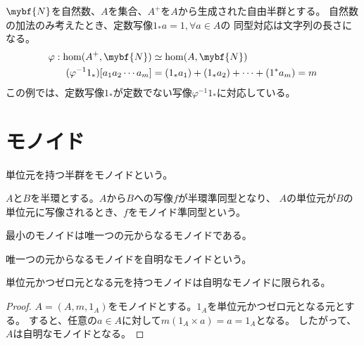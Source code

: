 	\begin{example}[文字列の長さ]\label{obs:文字列の長さ} %
		$\mybf{N}$を自然数、$A$を集合、$A^+$を$A$から生成された自由半群とする。
		自然数の加法のみ考えたとき、定数写像$1_*a=1,\forall a\in A$の
		同型対応は文字列の長さになる。
		\begin{equation*}\begin{split} %
			\varphi: \hom(A^+,\mybf{N}) &\simeq \hom(A,\mybf{N}) \\
			(\varphi^{-1}1_*)[a_1a_2\cdots a_m] &= (1_*a_1)+(1_*a_2)+\cdots+(1^*a_m) = m \\
		\end{split}\end{equation*} %
		この例では、定数写像$1_*$が定数でない写像$\varphi^{-1}1_*$に対応している。
	\end{example} %

\section{モノイド}\label{s1:モノイド} %
	\begin{definition}[モノイド]\label{def:モノイド} %
		単位元を持つ半群をモノイドという。
	\end{definition} %

	\begin{definition}[モノイド準同型]\label{def:モノイド準同型} %
		$A$と$B$を半環とする。$A$から$B$への写像$f$が半環準同型となり、
		$A$の単位元が$B$の単位元に写像されるとき、$f$をモノイド準同型という。
	\end{definition} %

	最小のモノイドは唯一つの元からなるモノイドである。

	\begin{definition}[自明なモノイド]\label{def:自明なモノイド} %
		唯一つの元からなるモノイドを自明なモノイドという。
	\end{definition} %

	\begin{proposition}[ゼロ元かつ単位元を持つモノイド]\label{prop:ゼロ元かつ単位元を持つモノイド} %
		単位元かつゼロ元となる元を持つモノイドは自明なモノイドに限られる。
	\end{proposition} %
	\begin{proof} %
		$A=(A,m,1_A)$をモノイドとする。$1_A$を単位元かつゼロ元となる元とする。
		すると、任意の$a\in A$に対して$m(1_A\times a)=a=1_A$となる。
		したがって、$A$は自明なモノイドとなる。
	\end{proof} %


